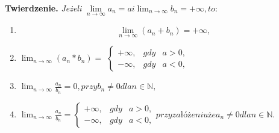 \documentclass[a4paper,12pt]{article}
\begin{document}
 
	\textbf{Twierdzenie.} \textit{Jeżeli} $ \lim\limits_{n \to \infty} a_n = a i \lim_{n \to \infty} b_n = +\infty, to:$
	\begin{enumerate}[label={\arabic*°}]
		
		\item \begin{equation}
\lim_{n \to \infty}(a_n + b_n) = +\infty,
		\end{equation}
		\item $\lim_{n \to \infty}(a_n * b_n) = $
	$\left \{	
	\begin{array}{ccc}
	+\infty, & gdy & a>0,\\
	-\infty, & gdy & a<0,
	\end{array}
		\right .
	$
	\item $\lim_{n \to \infty}\frac{a_n}{b_n} = 0, przy b_n \neq 0 dla n \in \mathbb{N},$
	\item $	\lim_{n \to \infty}\frac{a_n}{b_n} = 
	\left \{	
	\begin{array}{ccc}
		+\infty, & gdy & a>0,\\
		-\infty, & gdy & a<0,
	\end{array}
	\right . przy załóżeniu że a_n \neq 0 dla n \in \mathbb{N}.$
\end{enumerate}
\end{document}
